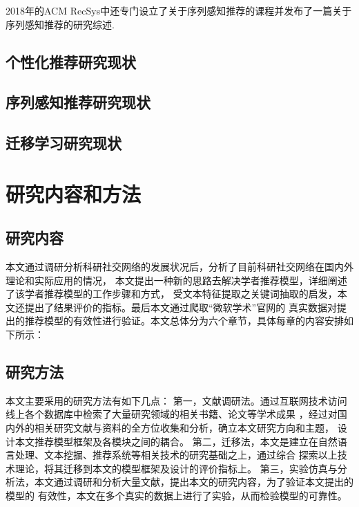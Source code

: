 2018年的ACM RecSys中还专门设立了关于序列感知推荐的课程并发布了一篇关于序列感知推荐的研究综述.
\subsection{个性化推荐研究现状}
\subsection{序列感知推荐研究现状}
\subsection{迁移学习研究现状}


\section{研究内容和方法}
\subsection{研究内容}
本文通过调研分析科研社交网络的发展状况后，分析了目前科研社交网络在国内外理论和实际应用的情况，%
本文提出一种新的思路去解决学者推荐模型，详细阐述了该学者推荐模型的工作步骤和方式，%
受文本特征提取之关键词抽取的启发，本文还提出了结果评价的指标。最后本文通过爬取“微软学术”官网的%
真实数据对提出的推荐模型的有效性进行验证。本文总体分为六个章节，具体每章的内容安排如下所示：

\subsection{研究方法}
本文主要采用的研究方法有如下几点：
第一，文献调研法。通过互联网技术访问线上各个数据库中检索了大量研究领域的相关书籍、论文等学术成果%
，经过对国内外的相关研究文献与资料的全方位收集和分析，确立本文研究方向和主题，%
设计本文推荐模型框架及各模块之间的耦合。
第二，迁移法，本文是建立在自然语言处理、文本挖掘、推荐系统等相关技术的研究基础之上，通过综合%
探索以上技术理论，将其迁移到本文的模型框架及设计的评价指标上。
第三，实验仿真与分析法，本文通过调研和分析大量文献，提出本文的研究内容，为了验证本文提出的模型的%
有效性，本文在多个真实的数据上进行了实验，从而检验模型的可靠性。
